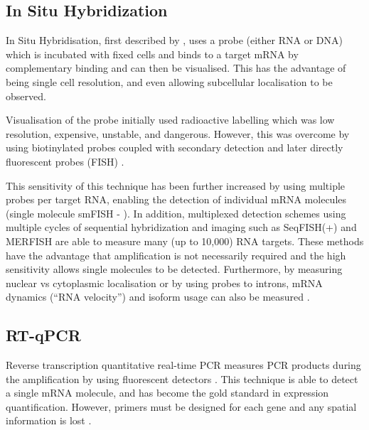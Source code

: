 \subsection{In Situ Hybridization}
In Situ Hybridisation, first described by \cite{Gall1969Formation}, uses a probe (either RNA or DNA) which is incubated with fixed cells and binds to a target mRNA by complementary binding and can then be visualised. This has the advantage of being single cell resolution, and even allowing subcellular localisation to be observed.

Visualisation of the probe initially used radioactive labelling which was low resolution, expensive, unstable, and dangerous. However, this was overcome by using biotinylated probes coupled with secondary detection \parencite{Singer1982Actin} and later directly fluorescent probes (FISH) \parencite{Kislauskis1993Isoformspecific}.

This sensitivity of this technique has been further increased by using multiple probes per target RNA, enabling the detection of individual mRNA molecules (single molecule smFISH - \cite{Femino1998Visualization, Raj2008Imaging}). In addition, multiplexed detection schemes using multiple cycles of sequential hybridization and imaging such as SeqFISH(+) \parencite{Lubeck2014Singlecell,Eng2017Profiling,Eng2019Transcriptomescale} and MERFISH \parencite{Chen2015Spatially, Moffitt2016Highthroughput, Moffitt2016Highperformance, Xia2019Multiplexed} are able to measure many (up to 10,000) RNA targets. These methods have the advantage that amplification is not necessarily required and the high sensitivity allows single molecules to be detected. Furthermore, by measuring nuclear vs cytoplasmic localisation or by using probes to introns, mRNA dynamics (``RNA velocity'') and isoform usage can also be measured \parencite{Shah2018Dynamics, Xia2019Spatial}.


\subsection{RT-qPCR}
Reverse transcription quantitative real-time PCR measures PCR products during the amplification by using fluorescent detectors \parencite{Gibson1996novel, Heid1996Real, Chiang1996Use}. This technique is able to detect a single mRNA molecule, and has become the gold standard in expression quantification. However, primers must be designed for each gene and any spatial information is lost \parencite{Palmer2003New, Wong2005Realtime}.

